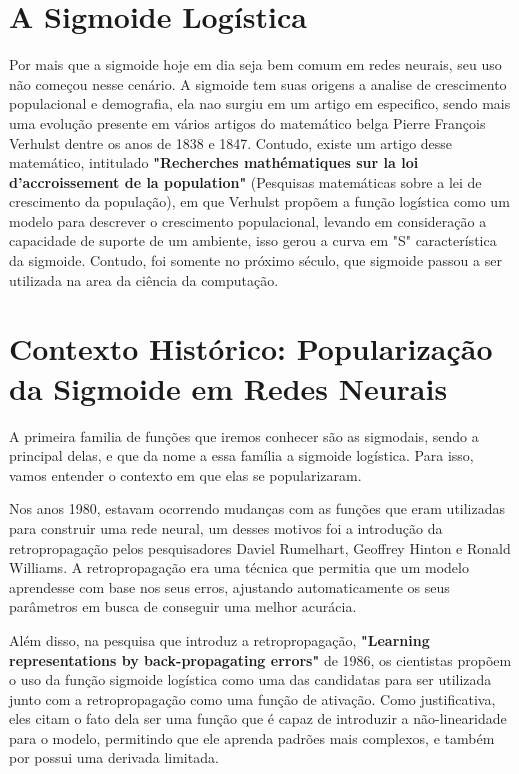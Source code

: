 \section{A Sigmoide Logística}

Por mais que a sigmoide hoje em dia seja bem comum em redes neurais, seu uso não começou nesse cenário. A sigmoide tem suas origens a analise de crescimento populacional e demografia, ela nao surgiu em um artigo em especifico, sendo mais uma evolução presente em vários artigos do matemático belga Pierre François Verhulst dentre os anos de 1838 e 1847. Contudo, existe um artigo desse matemático, intitulado \textbf{"Recherches mathématiques sur la loi d'accroissement de la population"} (Pesquisas matemáticas sobre a lei de crescimento da população), em que Verhulst propõem a função logística como um modelo para descrever o crescimento populacional, levando em consideração a capacidade de suporte de um ambiente, isso gerou a curva em "S" característica da sigmoide. Contudo, foi somente no próximo século, que sigmoide passou a ser utilizada na area da ciência da computação.

\section{Contexto Histórico: Popularização da Sigmoide em Redes Neurais}

A primeira familia de funções que iremos conhecer são as sigmodais, sendo a principal delas, e que da nome a essa família a sigmoide logística. Para isso, vamos entender o contexto em que elas se popularizaram.

Nos anos 1980, estavam ocorrendo mudanças com as funções que eram utilizadas para construir uma rede neural, um desses motivos foi a introdução da retropropagação pelos pesquisadores Daviel Rumelhart, Geoffrey Hinton e Ronald Williams. A retropropagação era uma técnica que permitia que um modelo aprendesse com base nos seus erros, ajustando automaticamente os seus parâmetros em busca de conseguir uma melhor acurácia. 

Além disso, na pesquisa que introduz a retropropagação, \textbf{"Learning representations by back-propagating errors"} de 1986, os cientistas propõem o uso da função sigmoide logística como uma das candidatas para ser utilizada junto com a retropropagação como uma função de ativação. Como justificativa, eles citam o fato dela ser uma função que é capaz de introduzir a não-linearidade para o modelo, permitindo que ele aprenda padrões mais complexos, e também por possui uma derivada limitada.

